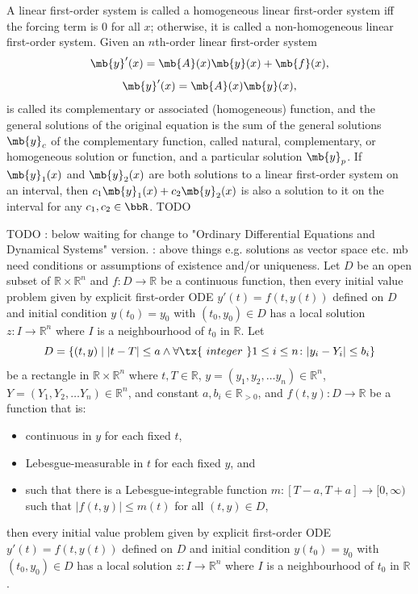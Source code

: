 \documentclass[a4paper,12pt]{report}
\begin{document}
A linear first-order system is called a homogeneous linear first-order system iff the forcing term is 0 for all $x$; otherwise, it is called a non-homogeneous linear first-order system.
Given an $n$th-order linear first-order system 
\[\mb{y}'(x)=\mb{A}(x)\mb{y}(x)+\mb{f}(x),\]
\[\mb{y}'(x)=\mb{A}(x)\mb{y}(x),\]
is called its complementary or associated (homogeneous) function, and the general solutions of the original equation is the sum of the general solutions $\mb{y}_c$ of the complementary function, called natural, complementary, or homogeneous solution or function, and a particular solution $\mb{y}_p$.
If $\mb{y}_1(x)$ and $\mb{y}_2(x)$ are both solutions to a linear first-order system on an interval, then $c_1\mb{y}_1(x)+c_2\mb{y}_2(x)$ is also a solution to it on the interval for any $c_1,c_2\in\bbR$.
TODO







TODO
: below waiting for change to "Ordinary Differential Equations and Dynamical Systems" version.
: above things e.g. solutions as vector space etc. mb need conditions or assumptions of existence and/or uniqueness.
Let $D$ be an open subset of $\mathbb{R}\times\mathbb{R}^n$ and $f\colon D\to \mathbb {R}$ be a continuous function, then every initial value problem given by explicit first-order ODE $y'(t)=f\left(t,y(t)\right)$ defined on $D$ and initial condition $y\left(t_{0}\right)=y_{0}$ with $(t_{0},y_{0})\in D$ has a local solution $z\colon I\to \mathbb {R}^n$ where $I$ is a neighbourhood of $t_0$ in $\mathbb {R} $.
Let
\[D=\{(t,y)\mid|t-T|\leq a\land\forall\tx{\ integer\ }1\leq i\leq n\colon |y_i-Y_i|\leq b_i\}\]
be a rectangle in $\mathbb{R}\times\mathbb{R}^n$ where $t,T\in\mathbb{R}$, $y=(y_1, y_2,\dots  y_n)\in\mathbb{R}^n$, $Y=(Y_1, Y_2,\dots  Y_n)\in\mathbb{R}^n$, and constant $a,b_i\in\mathbb{R}_{>0}$, and $f(t,y)\colon D\to \mathbb {R}$ be a function that is:
\begin{itemize}
\item continuous in $y$ for each fixed $t$,
\item Lebesgue-measurable in $t$ for each fixed $y$, and
\item such that there is a Lebesgue-integrable function $m\colon [T-a,T+a]\to [0,\infty )$ such that $|f(t,y)|\leq m(t)$ for all $(t,y)\in D$,
\end{itemize}
then every initial value problem given by explicit first-order ODE $y'(t)=f\left(t,y(t)\right)$ defined on $D$ and initial condition $y\left(t_{0}\right)=y_{0}$ with $(t_{0},y_{0})\in D$ has a local solution $z\colon I\to \mathbb {R}^n$ where $I$ is a neighbourhood of $t_0$ in $\mathbb{R}$.
\end{document}
